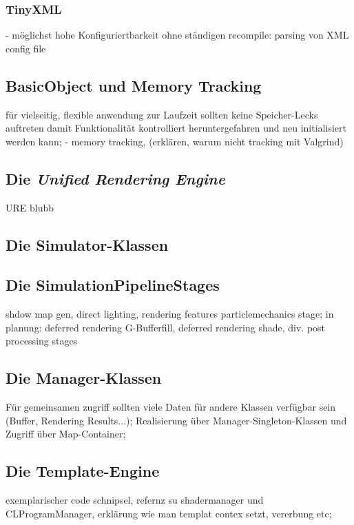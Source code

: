     \subsubsection{TinyXML}
    - möglichst hohe Konfiguriertbarkeit ohne ständigen recompile: parsing von XML config file
    	
 
\subsection{BasicObject und Memory Tracking}
	 für vielseitig, flexible anwendung zur Laufzeit sollten keine 	Speicher-Lecks auftreten damit Funktionalität 
	 kontrolliert heruntergefahren und neu initialisiert werden kann; 
	 	- memory tracking, (erklären, warum nicht tracking mit Valgrind)
 
    	
\subsection{Die \emph{Unified Rendering Engine}}
URE blubb

\subsection{Die Simulator-Klassen}


\subsection{Die SimulationPipelineStages}
	shdow map gen, direct lighting, rendering features particlemechanics stage;
	in planung: deferred rendering G-Bufferfill, deferred rendering shade, div. post processing stages


\subsection{Die Manager-Klassen}
Für gemeinsamen zugriff sollten viele Daten für andere Klassen verfügbar sein (Buffer, Rendering Results...); 	
Realisierung über Manager-Singleton-Klassen und Zugriff über Map-Container;

\subsection{Die Template-Engine}
	\label{sec:architecture:templateEngine}
	exemplarischer code schnipsel, refernz su shadermanager und CLProgramManager, erklärung wie man templat contex setzt, 	
	vererbung etc;
    	

